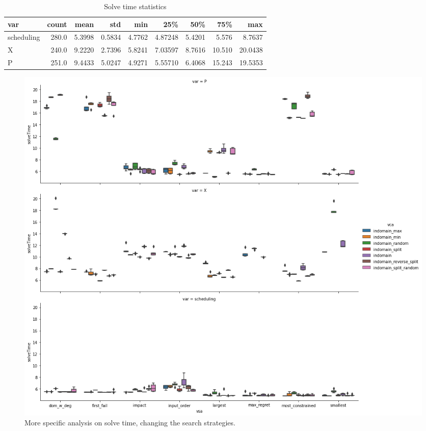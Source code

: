 \documentclass[10pt]{article}
\begin{document}
	\begin{table}
		\scriptsize
		\centering
		\begin{tabular}{lrrrrrrrr}
		\toprule
		var &  count &      mean &       std &      min &       25\% &       50\% &     75\% &       max \\
		\midrule
		scheduling &  280.0 &  5.3998 &  0.5834 &  4.7762 &  4.87248 &  5.4201 &   5.576 &   8.7637 \\
		X          &  240.0 &  9.2220 &  2.7396 &  5.8241 &  7.03597 &  8.7616 &  10.510 &  20.0438 \\
		P          &  251.0 &  9.4433 &  5.0247 &  4.9271 &  5.55710 &  6.4068 &  15.243 &  19.5353 \\
		\bottomrule
		\end{tabular}

		\caption{Solve time statistics}
		\label{tab:more-specific}
	\end{table}

	\begin{figure}
		\centering
		\includegraphics[width=\textwidth]{solve-time-specific.png}
		\caption{More specific analysis on solve time, changing the search strategies.}
		\label{fig:solve-time-specific}
	\end{figure}


	\pagebreak
\end{document}
